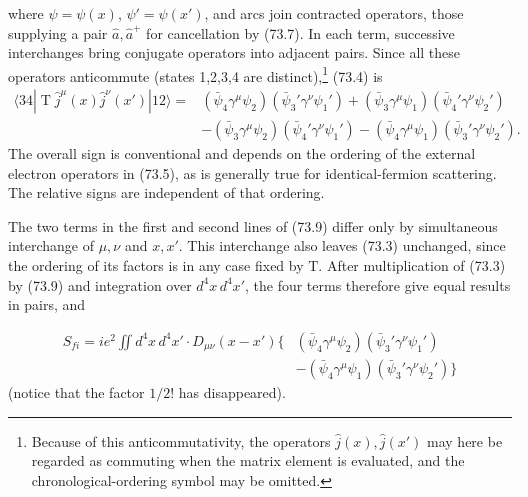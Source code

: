 where $\psi=\psi(x)$, $\psi'=\psi(x')$, and arcs join contracted operators, those supplying a pair $\hat a,\hat a^+$ for cancellation by (73.7). In each term, successive interchanges bring conjugate operators into adjacent pairs. Since all these operators anticommute (states 1,2,3,4 are distinct),\footnote{Because of this anticommutativity, the operators $\hat j(x),\hat j(x')$ may here be regarded as commuting when the matrix element is evaluated, and the chronological-ordering symbol may be omitted.} (73.4) is
\begin{equation}
\begin{aligned}
\langle34|\mathop{\mathrm T}\hat j^\mu(x)\hat j^\nu(x')|12\rangle={}&
(\bar\psi_4\gamma^\mu\psi_2)(\bar\psi_3'\gamma^\nu\psi_1')
+(\bar\psi_3\gamma^\mu\psi_1)(\bar\psi_4'\gamma^\nu\psi_2')\\
&-(\bar\psi_3\gamma^\mu\psi_2)(\bar\psi_4'\gamma^\nu\psi_1')
-(\bar\psi_4\gamma^\mu\psi_1)(\bar\psi_3'\gamma^\nu\psi_2').
\end{aligned}
\tag{73.9}
\end{equation}
The overall sign is conventional and depends on the ordering of the external electron operators in (73.5), as is generally true for identical-fermion scattering. The relative signs are independent of that ordering.

The two terms in the first and second lines of (73.9) differ only by simultaneous interchange of $\mu,\nu$ and $x,x'$. This interchange also leaves (73.3) unchanged, since the ordering of its factors is in any case fixed by $\mathrm T$. After multiplication of (73.3) by (73.9) and integration over $d^4x\,d^4x'$, the four terms therefore give equal results in pairs, and

\begin{equation}
\begin{aligned}
S_{fi}=ie^2\iint d^4x\,d^4x'\cdot D_{\mu\nu}(x-x')
\bigl\{&(\bar\psi_4\gamma^\mu\psi_2)(\bar\psi_3'\gamma^\nu\psi_1')\\
&-(\bar\psi_4\gamma^\mu\psi_1)(\bar\psi_3'\gamma^\nu\psi_2')\bigr\}
\end{aligned}
\tag{73.10}
\end{equation}
(notice that the factor $1/2!$ has disappeared).

